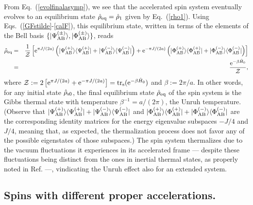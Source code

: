 \documentclass[]{nature}
\begin{document}
{From Eq.~(\ref{evolfinalasymp}), we see that the accelerated spin 
system eventually evolves to an equilibrium state $\hat \rho_{\rm eq} = \hat \rho_1$ given 
by Eq.~(\ref{rho1}). 
Using Eqs.~(\ref{GFstilde}-\ref{calF}), this equilibrium state,
written in terms of the elements of the Bell basis
$\{|\Psi_{\rm AB}^{(\pm)}\rangle,|\Phi_{\rm AB}^{(\pm)}\rangle\}$, reads
\begin{eqnarray}
\hat\rho_{\rm eq}& =& \frac{1}{{\cal Z}}\left[{\rm e}^{\pi J/(2a)} \left(|\Psi_{\rm AB}^{(+)}\rangle \langle\Psi_{\rm AB}^{(+)}|+|\Psi_{\rm AB}^{(-)}\rangle \langle\Psi_{\rm AB}^{(-)}|\right)
+{\rm e}^{-\pi J/(2a)} \left(|\Phi_{\rm AB}^{(+)}\rangle \langle\Phi_{\rm AB}^{(+)}|+|\Phi_{\rm AB}^{(-)}\rangle \langle\Phi_{\rm AB}^{(-)}|\right)\right]\nonumber \\
&=&\frac{{\rm e}^{-\beta\hat H_0}}{\cal Z},
\label{rhoeqa}
\end{eqnarray}
where ${\cal Z}:= 2 \left[{\rm e}^{\pi J/(2a)}+{\rm e}^{-\pi J/(2a)}\right] = {\rm tr}_{\rm s}({\rm e}^{-\beta \hat{H}_0})$ and $\beta := 
2\pi/a$.
In other words, 
for any
initial state $\hat \rho_{\rm s0}$, the final
equilibrium state $\hat \rho_{\rm eq}$ of the spin system is the 
Gibbs thermal state with  temperature $\beta^{-1} = a/(2\pi)$, the Unruh temperature.
(Observe that $|\Psi_{\rm AB}^{(+)}\rangle \langle\Psi_{\rm AB}^{(+)}|+|\Psi_{\rm AB}^{(-)}\rangle \langle\Psi_{\rm AB}^{(-)}|$ and $|\Phi_{\rm AB}^{(+)}\rangle \langle\Phi_{\rm AB}^{(+)}|+|\Phi_{\rm AB}^{(-)}\rangle \langle\Phi_{\rm AB}^{(-)}|$ are the corresponding identity matrices for the energy eigenvalue subspaces $-J/4$ and $J/4$, meaning that, as expected, the thermalization process does not favor any of the possible eigenstates of those subspaces.)
The spin system  thermalizes due to 
the vacuum fluctuations it experiences in its accelerated frame --- despite these fluctuations being distinct from the ones in inertial thermal states, as properly noted
in Ref.\cite{AS} ---, vindicating the Unruh effect also for an extended 
system.



\subsection{Spins with different proper accelerations.}
\label{subsec:diff}

}
\end{document}
